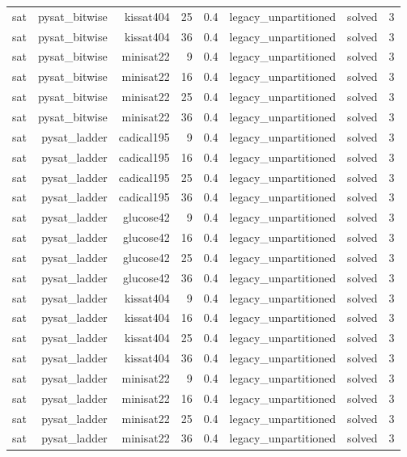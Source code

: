 \begin{tabular}{lrrrrrrr}
sat & pysat\_bitwise & kissat404 & 25 & 0.4 & legacy\_unpartitioned & solved & 3 \\
sat & pysat\_bitwise & kissat404 & 36 & 0.4 & legacy\_unpartitioned & solved & 3 \\
sat & pysat\_bitwise & minisat22 & 9 & 0.4 & legacy\_unpartitioned & solved & 3 \\
sat & pysat\_bitwise & minisat22 & 16 & 0.4 & legacy\_unpartitioned & solved & 3 \\
sat & pysat\_bitwise & minisat22 & 25 & 0.4 & legacy\_unpartitioned & solved & 3 \\
sat & pysat\_bitwise & minisat22 & 36 & 0.4 & legacy\_unpartitioned & solved & 3 \\
sat & pysat\_ladder & cadical195 & 9 & 0.4 & legacy\_unpartitioned & solved & 3 \\
sat & pysat\_ladder & cadical195 & 16 & 0.4 & legacy\_unpartitioned & solved & 3 \\
sat & pysat\_ladder & cadical195 & 25 & 0.4 & legacy\_unpartitioned & solved & 3 \\
sat & pysat\_ladder & cadical195 & 36 & 0.4 & legacy\_unpartitioned & solved & 3 \\
sat & pysat\_ladder & glucose42 & 9 & 0.4 & legacy\_unpartitioned & solved & 3 \\
sat & pysat\_ladder & glucose42 & 16 & 0.4 & legacy\_unpartitioned & solved & 3 \\
sat & pysat\_ladder & glucose42 & 25 & 0.4 & legacy\_unpartitioned & solved & 3 \\
sat & pysat\_ladder & glucose42 & 36 & 0.4 & legacy\_unpartitioned & solved & 3 \\
sat & pysat\_ladder & kissat404 & 9 & 0.4 & legacy\_unpartitioned & solved & 3 \\
sat & pysat\_ladder & kissat404 & 16 & 0.4 & legacy\_unpartitioned & solved & 3 \\
sat & pysat\_ladder & kissat404 & 25 & 0.4 & legacy\_unpartitioned & solved & 3 \\
sat & pysat\_ladder & kissat404 & 36 & 0.4 & legacy\_unpartitioned & solved & 3 \\
sat & pysat\_ladder & minisat22 & 9 & 0.4 & legacy\_unpartitioned & solved & 3 \\
sat & pysat\_ladder & minisat22 & 16 & 0.4 & legacy\_unpartitioned & solved & 3 \\
sat & pysat\_ladder & minisat22 & 25 & 0.4 & legacy\_unpartitioned & solved & 3 \\
sat & pysat\_ladder & minisat22 & 36 & 0.4 & legacy\_unpartitioned & solved & 3 \\

\end{tabular}
